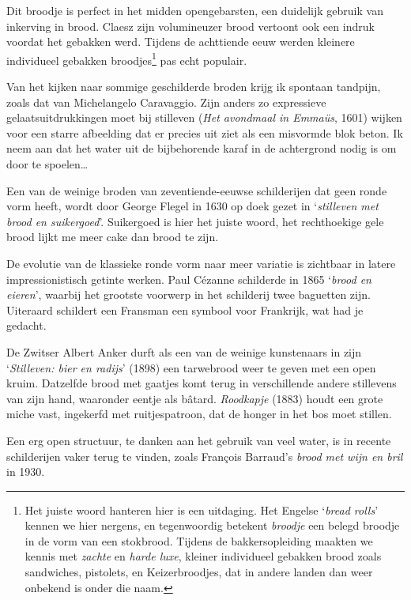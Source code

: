 \documentclass[
  11pt,
  dutch,
]{memoir}
\begin{document}
Dit broodje is perfect in het midden opengebarsten, een duidelijk
gebruik van inkerving in brood. Claesz zijn volumineuzer brood vertoont
ook een indruk voordat het gebakken werd. Tijdens de achttiende eeuw
werden kleinere individueel gebakken broodjes\footnote{Het juiste woord
  hanteren hier is een uitdaging. Het Engelse `\emph{bread rolls}'
  kennen we hier nergens, en tegenwoordig betekent \emph{broodje} een
  belegd broodje in de vorm van een stokbrood. Tijdens de
  bakkersopleiding maakten we kennis met \emph{zachte} en \emph{harde
  luxe}, kleiner individueel gebakken brood zoals sandwiches, pistolets,
  en Keizerbroodjes, dat in andere landen dan weer onbekend is onder die
  naam.} pas echt populair.

Van het kijken naar sommige geschilderde broden krijg ik spontaan
tandpijn, zoals dat van Michelangelo Caravaggio. Zijn anders zo
expressieve gelaatsuitdrukkingen moet bij stilleven (\emph{Het avondmaal
in Emmaüs}, 1601) wijken voor een starre afbeelding dat er precies uit
ziet als een misvormde blok beton. Ik neem aan dat het water uit de
bijbehorende karaf in de achtergrond nodig is om door te spoelen\ldots{}

Een van de weinige broden van zeventiende-eeuwse schilderijen dat geen
ronde vorm heeft, wordt door George Flegel in 1630 op doek gezet in
`\emph{stilleven met brood en suikergoed}'. Suikergoed is hier het
juiste woord, het rechthoekige gele brood lijkt me meer cake dan brood
te zijn.

De evolutie van de klassieke ronde vorm naar meer variatie is zichtbaar
in latere impressionistisch getinte werken. Paul Cézanne schilderde in
1865 `\emph{brood en eieren}', waarbij het grootste voorwerp in het
schilderij twee baguetten zijn. Uiteraard schildert een Fransman een
symbool voor Frankrijk, wat had je gedacht.

De Zwitser Albert Anker durft als een van de weinige kunstenaars in zijn
`\emph{Stilleven: bier en radijs}' (1898) een tarwebrood weer te geven
met een open kruim. Datzelfde brood met gaatjes komt terug in
verschillende andere stillevens van zijn hand, waaronder eentje als
bâtard. \emph{Roodkapje} (1883) houdt een grote miche vast, ingekerfd
met ruitjespatroon, dat de honger in het bos moet stillen.

Een erg open structuur, te danken aan het gebruik van veel water, is in
recente schilderijen vaker terug te vinden, zoals François Barraud's
\emph{brood met wijn en bril} in 1930.

\mbox{}
\end{document}
